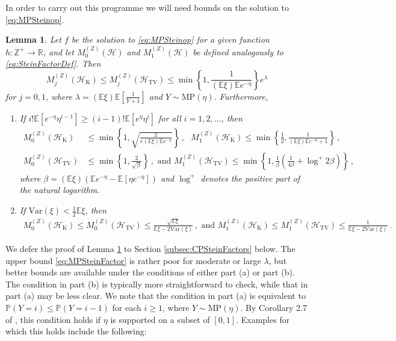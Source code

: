\documentclass[12pt]{article}
\newtheorem{lemma}[theorem]{Lemma}
\begin{document}
In order to carry out this programme we will need bounds on the solution to \eqref{eq:MPSteinop}.
\begin{lemma} \label{lem:CPSteinFactors}
Let $f$ be the solution to \eqref{eq:MPSteinop} for a given function $h:\mathbb{Z}^+\to\mathbb{R}$, and let $M_0^{(Z)}(\mathcal{H})$ and $M_1^{(Z)}(\mathcal{H})$ be defined analogously to \eqref{eq:SteinFactorDef}. Then
\begin{equation}\label{eq:MPSteinFactor}
M_j^{(Z)}(\mathcal{H}_\text{K})\leq M_j^{(Z)}(\mathcal{H}_\text{TV})\leq\min\left\{1,\frac{1}{(\mathbb{E}\xi)\mathbb{E}e^{-\eta}}\right\}e^\lambda
\end{equation}
for $j=0,1$, where $\lambda=(\mathbb{E}\xi)\mathbb{E}\left[\frac{1}{Y+1}\right]$ and $Y\sim\text{MP}(\eta)$. Furthermore,
\begin{enumerate}
\item[(a)] If $i!\mathbb{E}[e^{-\eta}\eta^{i-1}]\geq(i-1)!\mathbb{E}[e^{\eta}\eta^i]$ for all $i=1,2,\ldots$, then
\begin{align*}
M_0^{(Z)}(\mathcal{H}_\text{K})&\leq\min\left\{1,\sqrt{\frac{2}{e(\mathbb{E}\xi)\mathbb{E}e^{-\eta}}}\right\}\,,\text{ }
M_1^{(Z)}(\mathcal{H}_\text{K})\leq\min\left\{\frac{1}{2},\frac{1}{(\mathbb{E}\xi)\mathbb{E}e^{-\eta}+1}\right\}\,,\\
M_0^{(Z)}(\mathcal{H}_\text{TV})&\leq\min\left\{1,\frac{2}{\sqrt{\beta}}\right\}\,,\text{ and }
M_1^{(Z)}(\mathcal{H}_\text{TV})\leq\min\left\{1,\frac{1}{\beta}\left(\frac{1}{4\beta}+\log^+2\beta\right)\right\}\,,
\end{align*}
where $\beta=(\mathbb{E}\xi)(\mathbb{E}e^{-\eta}-\mathbb{E}[\eta e^{-\eta}])$ and $\log^+$ denotes the positive part of the natural logarithm.
\item[(b)] If $\text{Var}(\xi)<\frac{1}{2}\mathbb{E}\xi$, then
\begin{align*}
M_0^{(Z)}(\mathcal{H}_\text{K})\leq M_0^{(Z)}(\mathcal{H}_\text{TV})\leq\frac{\sqrt{\mathbb{E}\xi}}{\mathbb{E}\xi-2\text{Var}(\xi)}\,,\text{ and }
M_1^{(Z)}(\mathcal{H}_\text{K})\leq M_1^{(Z)}(\mathcal{H}_\text{TV})\leq\frac{1}{\mathbb{E}\xi-2\text{Var}(\xi)}\,.
\end{align*}
\end{enumerate}
\end{lemma}
We defer the proof of Lemma \ref{lem:CPSteinFactors} to Section \ref{subsec:CPSteinFactors} below. The upper bound \eqref{eq:MPSteinFactor} is rather poor for moderate or large $\lambda$, but better bounds are available under the conditions of either part (a) or part (b). The condition in part (b) is typically more straightforward to check, while that in part (a) may be less clear. We note that the condition in part (a) is equivalent to $\mathbb{P}(Y=i)\leq\mathbb{P}(Y=i-1)$ for each $i\geq1$, where $Y\sim\text{MP}(\eta)$. By Corollary 2.7 of \cite{balabdaoui19}, this condition holds if $\eta$ is supported on a subset of $[0,1]$. Examples for which this holds include the following:
\end{document}
